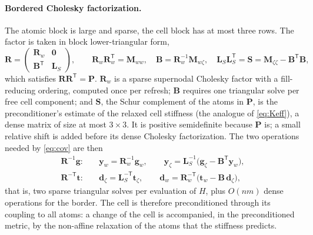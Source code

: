 \documentclass[11pt,a4paper]{article}
\begin{document}
\paragraph{Bordered Cholesky factorization.}
The atomic block is large and sparse, the cell block has at most three rows. The factor is taken in
block lower-triangular form,
\begin{equation}
  \mathbf R=\begin{pmatrix}\mathbf R_w&\mathbf 0\\ \mathbf B^{\mathsf T}&\mathbf L_S\end{pmatrix},\qquad
  \mathbf R_w\mathbf R_w^{\mathsf T}=\mathbf M_{ww},\quad
  \mathbf B=\mathbf R_w^{-1}\mathbf M_{w\zeta},\quad
  \mathbf L_S\mathbf L_S^{\mathsf T}=\mathbf S=\mathbf M_{\zeta\zeta}-\mathbf B^{\mathsf T}\mathbf B ,
  \label{eq:bordered}
\end{equation}
which satisfies \(\mathbf R\mathbf R^{\mathsf T}=\mathbf P\). \(\mathbf R_w\) is a sparse supernodal
Cholesky factor with a fill-reducing ordering, computed once per refresh; \(\mathbf B\) requires one
triangular solve per free cell component; and \(\mathbf S\), the Schur complement of the atoms in
\(\mathbf P\), is the preconditioner's estimate of the relaxed cell stiffness (the analogue of
\eqref{eq:Keff}), a dense matrix of size at most \(3\times3\). It is positive semidefinite because
\(\mathbf P\) is; a small relative shift is added before its dense Cholesky factorization. The two
operations needed by \eqref{eq:cov} are then
\begin{align}
  \mathbf R^{-1}\mathbf g:&\quad
  \mathbf y_w=\mathbf R_w^{-1}\mathbf g_w,\qquad
  \mathbf y_\zeta=\mathbf L_S^{-1}\big(\mathbf g_\zeta-\mathbf B^{\mathsf T}\mathbf y_w\big),
  \label{eq:Rinv}\\
  \mathbf R^{-\mathsf T}\mathbf t:&\quad
  \mathbf d_\zeta=\mathbf L_S^{-\mathsf T}\mathbf t_\zeta,\qquad
  \mathbf d_w=\mathbf R_w^{-\mathsf T}\big(\mathbf t_w-\mathbf B\,\mathbf d_\zeta\big),
  \label{eq:RinvT}
\end{align}
that is, two sparse triangular solves per evaluation of \(H\), plus \(O(nm)\) dense operations
for the border. The cell is therefore preconditioned through its coupling to all atoms: a change of
the cell is accompanied, in the preconditioned metric, by the non-affine relaxation of the atoms
that the stiffness predicts.
\end{document}
